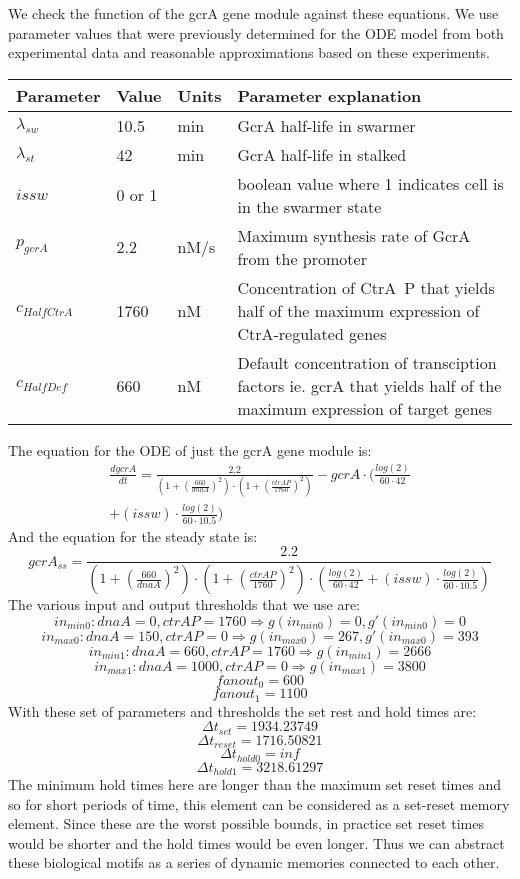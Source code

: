 \documentclass{article}
\begin{document}
We check the function of the gcrA gene module against these equations.  We use parameter values that were previously determined for the ODE model from both experimental data and reasonable approximations based on these experiments.  
\begin{center}

\begin{tabular}{|p{1.8cm}|p{1cm}|p{1cm}|p{7cm}| } 
 \hline
\textbf{Parameter} & \textbf{Value} & \textbf{Units} & \textbf{Parameter explanation} \\
\hline
$\lambda_{sw}$ & 10.5 & min & GcrA half-life in swarmer \\ 
\hline
$\lambda_{st}$ & 42 & min & GcrA half-life in stalked \\ 
\hline
$issw$ & 0 or 1 & & boolean value where 1 indicates cell is in the swarmer state \\
\hline
$p_{gcrA}$ & 2.2 & nM/s & Maximum synthesis rate of GcrA from the promoter \\ 
\hline
$c_{HalfCtrA}$ & 1760 & nM & Concentration of CtrA~P that yields half of the maximum expression of CtrA-regulated genes\\
\hline
$c_{HalfDef}$ & 660 & nM & Default concentration of transciption factors ie. gcrA that yields half of the maximum expression of target genes\\
\hline
\end{tabular}

\end{center}
The equation for the ODE of just the gcrA gene module is:
\[
\begin{split}
\frac{d gcrA}{d t}=\frac{2.2}{(1+(\frac{660}{dnaA})^2)\cdot (1+(\frac{ctrAP}{1760})^2)}-gcrA\cdot (\frac{log(2)}{60\cdot 42} \\
+(issw)\cdot \frac{log(2)}{60\cdot 10.5})
\end{split}
\]
And the equation for the steady state is:
\[gcrA_{ss}=\frac{2.2}{(1+(\frac{660}{dnaA})^2)\cdot (1+(\frac{ctrAP}{1760})^2)\cdot (\frac{log(2)}{60\cdot 42}
+(issw)\cdot \frac{log(2)}{60\cdot 10.5})}
\]
The various input and output thresholds that we use are:
\[in_{min0}: dnaA=0, ctrAP=1760  \Rightarrow g(in_{min0})=0, g'(in_{min0})=0
\]
\[in_{max0}: dnaA=150, ctrAP=0  \Rightarrow g(in_{max0})=267, g'(in_{max0})=393
\]
\[in_{min1}: dnaA=660, ctrAP=1760  \Rightarrow g(in_{min1})=2666 %
\]
\[in_{max1}: dnaA=1000, ctrAP=0  \Rightarrow g(in_{max1})=3800
\]
\[fanout_0=600
\]
\[fanout_1=1100
\]
With these set of parameters and thresholds the set rest and hold times are:
\[\Delta t_{set}=1934.23749
\]
\[\Delta t_{reset}=1716.50821
\]
\[\Delta t_{hold0}= inf
\]
\[\Delta t_{hold1}=3218.61297
\]
The minimum hold times here are longer than the maximum set reset times and so for short periods of time, this element can be considered as a set-reset memory element.  Since these are the worst possible bounds, in practice set reset times would be shorter and the hold times would be even longer.  Thus we can abstract these biological motifs as a series of dynamic memories connected to each other.
\end{document}
